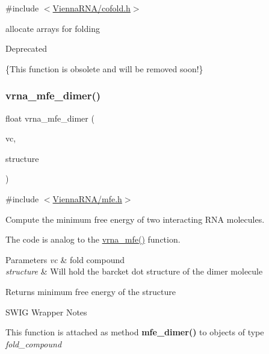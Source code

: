 {\ttfamily \#include $<$\mbox{\hyperlink{cofold_8h}{Vienna\+R\+N\+A/cofold.\+h}}$>$}

allocate arrays for folding \begin{DoxyRefDesc}{Deprecated}
\item[\mbox{\hyperlink{deprecated__deprecated000038}{Deprecated}}]\{This function is obsolete and will be removed soon!\} \end{DoxyRefDesc}
\mbox{\label{group__mfe__cofold_gaab22d10c1190f205f16a77cab9d5d3ee}} 
\subsubsection{\texorpdfstring{vrna\+\_\+mfe\+\_\+dimer()}{vrna\_mfe\_dimer()}}
{\footnotesize\ttfamily float vrna\+\_\+mfe\+\_\+dimer (\begin{DoxyParamCaption}\item[{\mbox{\hyperlink{group__fold__compound_ga1b0cef17fd40466cef5968eaeeff6166}{vrna\+\_\+fold\+\_\+compound\+\_\+t}} $\ast$}]{vc,  }\item[{char $\ast$}]{structure }\end{DoxyParamCaption})}



{\ttfamily \#include $<$\mbox{\hyperlink{mfe_8h}{Vienna\+R\+N\+A/mfe.\+h}}$>$}



Compute the minimum free energy of two interacting R\+NA molecules. 

The code is analog to the \mbox{\hyperlink{group__mfe__fold_gabd3b147371ccf25c577f88bbbaf159fd}{vrna\+\_\+mfe()}} function.


\begin{DoxyParams}{Parameters}
{\em vc} & fold compound \\
\hline
{\em structure} & Will hold the barcket dot structure of the dimer molecule \\
\hline
\end{DoxyParams}
\begin{DoxyReturn}{Returns}
minimum free energy of the structure
\end{DoxyReturn}
\begin{DoxyRefDesc}{S\+W\+I\+G Wrapper Notes}
\item[\mbox{\hyperlink{wrappers__wrappers000075}{S\+W\+I\+G Wrapper Notes}}]This function is attached as method {\bfseries mfe\+\_\+dimer()} to objects of type {\itshape fold\+\_\+compound} \end{DoxyRefDesc}
